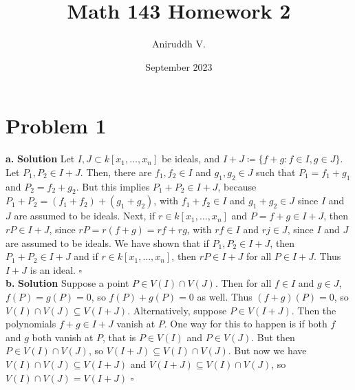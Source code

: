 \documentclass{article}
\title{Math 143 Homework 2}
\author{Aniruddh V.}
\date{September 2023}
\begin{document}
\maketitle

\section{Problem 1}
\textbf{a. } \textbf{Solution } Let $I, J \subset k[x_1, \ldots, x_n]$ be ideals, and $I + J \coloneqq \{f + g : f \in I, g \in J\}$. Let $P_1, P_2 \in I + J$.
Then, there are $f_1, f_2 \in I$ and $g_1, g_2 \in J$ such that $P_1 = f_1 + g_1$ and $P_2 = f_2 + g_2$. But this implies $P_1 + P_2 \in I+J$, because $P_1 + P_2 = (f_1 + f_2) + (g_1 + g_2)$,
with $f_1 + f_2 \in I$ and $g_1 + g_2 \in J$ since $I$ and $J$ are assumed to be ideals. 
Next, if $r \in  k[x_1, \ldots, x_n]$ and $P = f + g \in I + J$, then $rP \in I + J$, since $rP = r(f+g) = rf + rg$, with $rf \in I$ and $rj \in J$, since $I$ and $J$ are
assumed to be ideals. 
We have shown that if $P_1, P_2 \in I + J$, then $P_1 + P_2 \in I + J$ and if $r \in   k[x_1, \ldots, x_n]$, then $rP \in I + J$ for all $P \in I + J$. 
Thus $I + J$ is an ideal. $\square$ \\
\textbf{b. } \textbf{Solution } Suppose a point $P \in V(I) \cap V(J)$. Then for all $f \in I$ and $g \in J$, $f(P) = g(P) = 0$, so $f(P) + g(P) = 0$ as well. 
Thus $(f+g)(P) = 0$, so $V(I) \cap V(J) \subseteq V(I+J)$. Alternatively, suppose $P \in V(I + J)$. Then the polynomials $f+g \in I + J$ vanish at $P$. One way for this to happen is
if both $f$ and $g$ both vanish at $P$, that is $P \in V(I)$ and $P \in V(J)$. But then $P \in V(I) \cap V(J)$, so $V(I + J) \subseteq V(I) \cap V(J)$. 
But now we have  $V(I) \cap V(J) \subseteq V(I+J)$ and $V(I + J) \subseteq V(I) \cap V(J)$, so $V(I) \cap V(J) = V(I + J)$ $\square$
\end{document}
